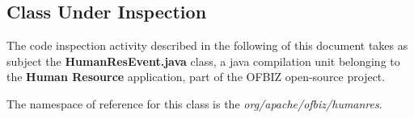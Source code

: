 \subsection{Class Under Inspection}

The code inspection activity described in the following of this document takes as subject the \textbf{HumanResEvent.java} class, a java compilation unit belonging to the \textbf{Human Resource} application, part of the OFBIZ open-source project.

The namespace of reference for this class is the \textit{org/apache/ofbiz/humanres}.
